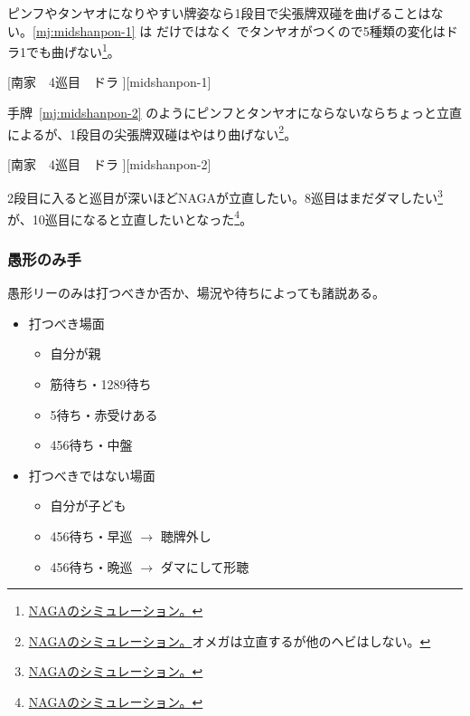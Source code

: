\documentclass[../nankiru_main.tex]{subfiles}
\begin{document}
ピンフやタンヤオになりやすい牌姿なら1段目で尖張牌双碰を曲げることはない。\ref{mj:midshanpon-1} は  だけではなく  でタンヤオがつくので5種類の変化はドラ1でも曲げない\footnote{\href{https://naga.dmv.nico/htmls/b54aa3ab3415c25091503f7538d5f4392f8dd8f81f07cf08f1a3215906ad76adv2_2.html?tw=1}{NAGAのシミュレーション。}}。

[南家　4巡目　ドラ ][midshanpon-1]

手牌~\ref{mj:midshanpon-2} のようにピンフとタンヤオにならないならちょっと立直によるが、1段目の尖張牌双碰はやはり曲げない\footnote{\href{https://naga.dmv.nico/htmls/8c2bd4b5841cb6cca44af62408bb00cdfd4165fd26776691a9ee891d767e8d80v2_2.html?tw=1}{NAGAのシミュレーション。}オメガは立直するが他のヘビはしない。}。

[南家　4巡目　ドラ ][midshanpon-2]

2段目に入ると巡目が深いほどNAGAが立直したい。8巡目はまだダマしたい\footnote{\href{https://naga.dmv.nico/htmls/d44d3e0059c563ff373cf9e4123c46e4fd66bcbb8cde386a935d8d96e6e041c9v2_2.html?tw=1}{NAGAのシミュレーション。}}が、10巡目になると立直したいとなった\footnote{\href{https://naga.dmv.nico/htmls/dfbfd7e6d647892ceb0c9803245896534697d58598d4446fb26bf48b60986b93v2_2.html?tw=3}{NAGAのシミュレーション。}}。


\subsubsection*{愚形のみ手}

愚形リーのみは打つべきか否か、場況や待ちによっても諸説ある。

\begin{itemize}
  \item 打つべき場面
  \begin{itemize}
    \item 自分が親 
    \item 筋待ち・1289待ち \citep[][p. 30]{miinin-stat}
    \item 5待ち・赤受けある \citep[][pp.~31--32]{ishibashi-black}
    \item 456待ち・中盤 
  \end{itemize}
  \item 打つべきではない場面
  \begin{itemize}
    \item 自分が子ども \citep[][p. 165]{rb1}
    \item 456待ち・早巡 $\to$ 聴牌外し 
    \item 456待ち・晩巡 $\to$ ダマにして形聴 
  \end{itemize}
\end{itemize}
\end{document}
